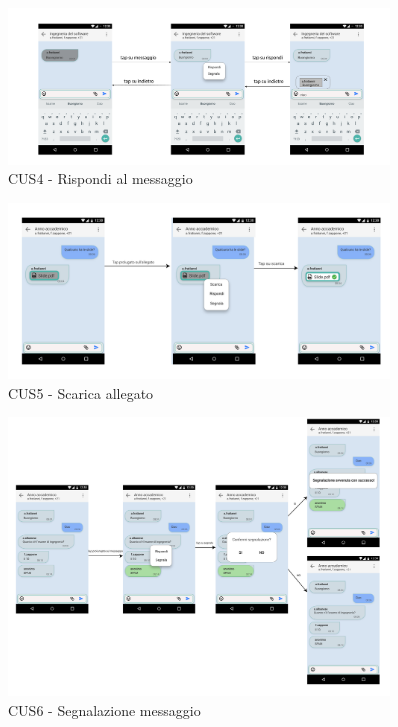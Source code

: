 \begin{figure}
	\centering
	\includegraphics[width=0.9\textwidth]{imgs/gruppo6/activities/act_cus4_rispondi_singolo_messaggio.pdf}
	\caption{CUS4 - Rispondi al messaggio}
	\label{fig:act-cus4}
\end{figure}

\begin{figure}
	\centering
	\includegraphics[width=0.9\textwidth]{imgs/gruppo6/activities/act_cus5_scarica_allegato.pdf}
	\caption{CUS5 - Scarica allegato}
	\label{fig:act-cus5}
\end{figure}

\begin{figure}
	\centering
	\includegraphics[width=0.9\textwidth]{imgs/gruppo6/activities/act_cus6_segnalazione_messaggio.pdf}
	\caption{CUS6 - Segnalazione messaggio}
	\label{fig:act-cus6}
\end{figure}

